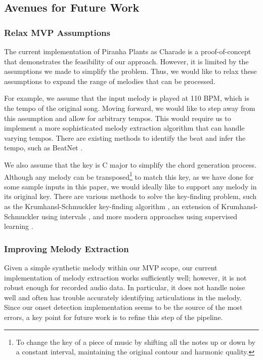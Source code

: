 \subsection{Avenues for Future Work}
\label{sec:avenues}

\subsubsection{Relax MVP Assumptions}

The current implementation of Piranha Plants as Charade is a proof-of-concept that demonstrates the feasibility of our approach. However, it is limited by the assumptions we made to simplify the problem. Thus, we would like to relax these assumptions to expand the range of melodies that can be processed.

For example, we assume that the input melody is played at 110 BPM, which is the tempo of the original song. Moving forward, we would like to step away from this assumption and allow for arbitrary tempos. This would require us to implement a more sophisticated melody extraction algorithm that can handle varying tempos. There are existing methods to identify the beat and infer the tempo, such as BeatNet \cite{BeatNet:2021}.

We also assume that the key is C major to simplify the chord generation process. Although any melody can be transposed\footnote{To change the key of a piece of music by shifting all the notes up or down by a constant interval, maintaining the original contour and harmonic quality.} to match this key, as we have done for some sample inputs in this paper, we would ideally like to support any melody in its original key. There are various methods to solve the key-finding problem, such as the Krumhansl-Schmuckler key-finding algorithm \autocite{KrumhanslSchmuckler:1992}, an extension of Krumhansl-Schmuckler using intervals \autocite{MadsenWidmer:2007}, and more modern approaches using supervised learning \autocite{Mahieu:2016}.

\subsubsection{Improving Melody Extraction}

Given a simple synthetic melody within our MVP scope, our current implementation of melody extraction works sufficiently well; however, it is not robust enough for recorded audio data. In particular, it does not handle noise well and often has trouble accurately identifying articulations in the melody. Since our onset detection implementation seems to be the source of the most errors, a key point for future work is to refine this step of the pipeline.

